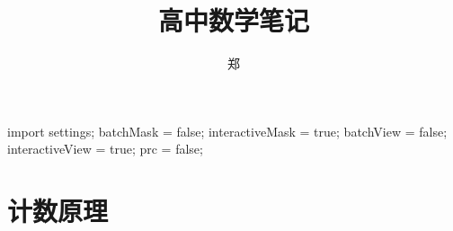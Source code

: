 \documentclass[a4paper, openany, UTF8]{ctexbook}
\title{{\Huge 高中数学笔记}}
\author{郑}
\begin{document}
	\begin{asydef}
		import settings;
		batchMask = false;
		interactiveMask = true;
		batchView = false;
		interactiveView = true;
		prc = false;
	\end{asydef}

	\frontmatter
	\maketitle

	

	\tableofcontents
	\clearpage
	\mainmatter
	\raggedbottom

	\part{计数原理}
	
	
\end{document}
